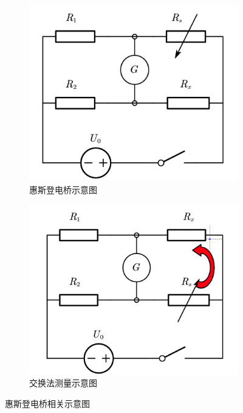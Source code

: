 \documentclass[]{../template/Report}%
\begin{document}
\begin{figure}[H]
    \centering
    \begin{subfigure}[b]{0.4\textwidth}
        \centering
        \includegraphics[width=\textwidth]{figures/自绘电桥.png}
        \caption{惠斯登电桥示意图}
        \label{fig:a}
    \end{subfigure}
    \begin{subfigure}[b]{0.415\textwidth}
        \centering
        \includegraphics[width=\textwidth]{figures/交换法.png}
        \caption{交换法测量示意图}
        \label{fig:b}
    \end{subfigure}
    \caption{惠斯登电桥相关示意图}
    \label{fig:fig1}
\end{figure}
\end{document}
